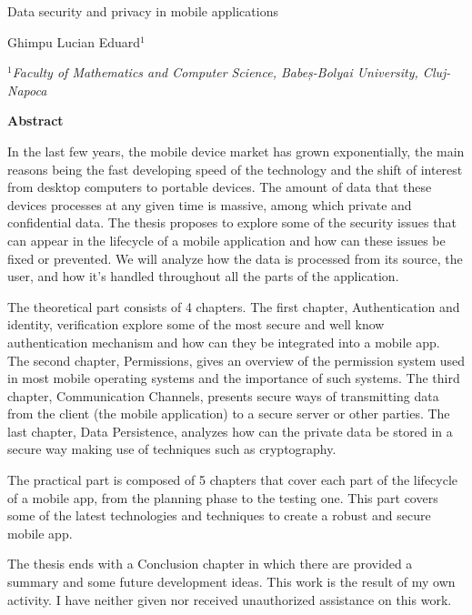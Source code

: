 \documentclass[a4paper, 12pt]{article}
\begin{document}

\Large
 \begin{center}
Data security and privacy in mobile applications\\ 

\hspace{10pt}

\large
Ghimpu Lucian Eduard$^1$ \\
\hspace{10pt}

\small
 \textit{$^1$Faculty of Mathematics and Computer Science, Babeș-Bolyai University, Cluj-Napoca}\\



\end{center}

\hspace{10pt}

\begin{center}
    \small
    \textbf{Abstract} \\
\end{center}


\normalsize

In the last few years, the mobile device market has grown exponentially, the main reasons being the fast developing speed of the technology and the shift of interest from desktop computers to portable devices. The amount of data that these devices processes at any given time is massive, among which private and confidential data.
The thesis proposes to explore some of the security issues that can appear in the lifecycle of a mobile application and how can these issues be fixed or prevented. We will analyze how the data is processed from its source, the user, and how it's handled throughout all the parts of the application.

The theoretical part consists of 4 chapters. The first chapter, Authentication and identity, verification explore some of the most secure and well know authentication mechanism and how can they be integrated into a mobile app. The second chapter, Permissions, gives an overview of the permission system used in most mobile operating systems and the importance of such systems. The third chapter, Communication Channels, presents secure ways of transmitting data from the client (the mobile application) to a secure server or other parties. The last chapter, Data Persistence, analyzes how can the private data be stored in a secure way making use of techniques such as cryptography.

The practical part is composed of 5 chapters that cover each part of the lifecycle of a mobile app, from the planning phase to the testing one. This part covers some of the latest technologies and techniques to create a robust and secure mobile app.

The thesis ends with a Conclusion chapter in which there are provided a summary and some future development ideas.
This work is the result of my own activity. I have neither given nor received unauthorized assistance on this work.
\end{document}
